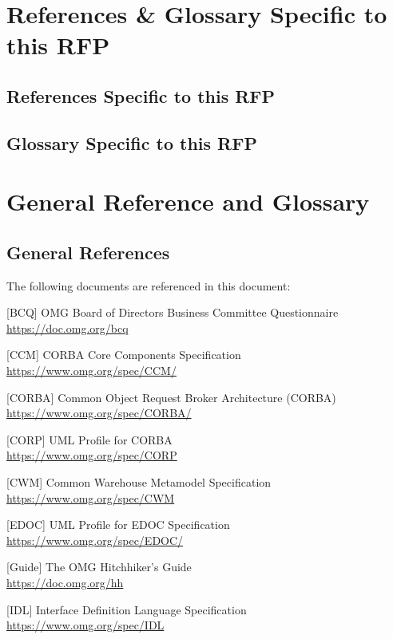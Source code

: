 \begin{appendices}
\section{References \& Glossary Specific to this RFP}
\subsection{References Specific to this RFP}

\subsection{Glossary Specific to this RFP}


\section{General Reference and Glossary}
\subsection{General References}
The following documents are referenced in this document:
\raggedright
\begin{adjustwidth}{0.25in}{}
[BCQ] OMG Board of Directors Business Committee Questionnaire \\
\url{https://doc.omg.org/bcq}

[CCM] CORBA Core Components Specification\\
\url{https://www.omg.org/spec/CCM/}

[CORBA] Common Object Request Broker Architecture (CORBA)\\
\url{https://www.omg.org/spec/CORBA/}

[CORP] UML Profile for CORBA\\
\url{https://www.omg.org/spec/CORP}

[CWM] Common Warehouse Metamodel Specification\\
\url{https://www.omg.org/spec/CWM}

[EDOC] UML Profile for EDOC Specification\\
\url{https://www.omg.org/spec/EDOC/}

[Guide] The OMG Hitchhiker's Guide\\
\url{https://doc.omg.org/hh}

[IDL] Interface Definition Language Specification\\
\url{https://www.omg.org/spec/IDL}


\end{adjustwidth}
\end{appendices}
